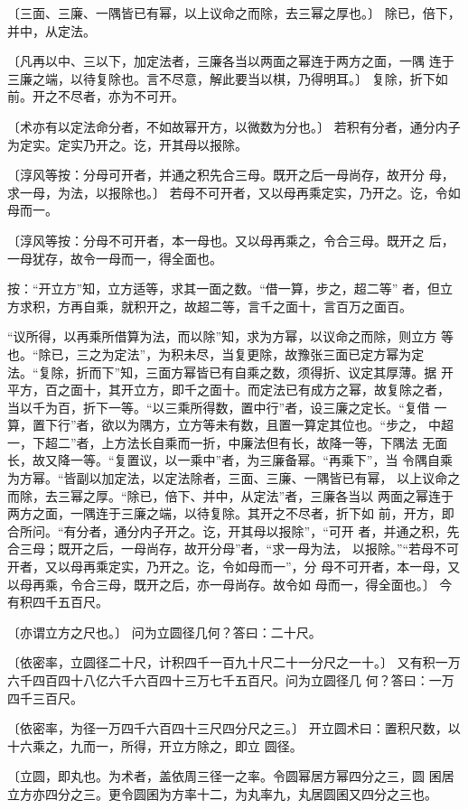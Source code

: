 \documentclass[12pt,UTF8]{ctexbook}
\begin{document}
〔三面、三廉、一隅皆已有幂，以上议命之而除，去三幂之厚也。〕 除已，倍下，并中，从定法。

〔凡再以中、三以下，加定法者，三廉各当以两面之幂连于两方之面，一隅 连于三廉之端，以待复除也。言不尽意，解此要当以棋，乃得明耳。〕 复除，折下如前。开之不尽者，亦为不可开。

〔术亦有以定法命分者，不如故幂开方，以微数为分也。〕 若积有分者，通分内子为定实。定实乃开之。讫，开其母以报除。

〔淳风等按：分母可开者，并通之积先合三母。既开之后一母尚存，故开分 母，求一母，为法，以报除也。〕 若母不可开者，又以母再乘定实，乃开之。讫，令如母而一。

〔淳风等按：分母不可开者，本一母也。又以母再乘之，令合三母。既开之 后，一母犹存，故令一母而一，得全面也。

按：“开立方”知，立方适等，求其一面之数。“借一算，步之，超二等” 者，但立方求积，方再自乘，就积开之，故超二等，言千之面十，言百万之面百。

“议所得，以再乘所借算为法，而以除”知，求为方幂，以议命之而除，则立方 等也。“除已，三之为定法”，为积未尽，当复更除，故豫张三面已定方幂为定 法。“复除，折而下”知，三面方幂皆已有自乘之数，须得折、议定其厚薄。据 开平方，百之面十，其开立方，即千之面十。而定法已有成方之幂，故复除之者， 当以千为百，折下一等。“以三乘所得数，置中行”者，设三廉之定长。“复借 一算，置下行”者，欲以为隅方，立方等未有数，且置一算定其位也。“步之， 中超一，下超二”者，上方法长自乘而一折，中廉法但有长，故降一等，下隅法 无面长，故又降一等。“复置议，以一乘中”者，为三廉备幂。“再乘下”，当 令隅自乘为方幂。“皆副以加定法，以定法除者，三面、三廉、一隅皆已有幂， 以上议命之而除，去三幂之厚。“除已，倍下、并中，从定法”者，三廉各当以 两面之幂连于两方之面，一隅连于三廉之端，以待复除。其开之不尽者，折下如 前，开方，即合所问。“有分者，通分内子开之。讫，开其母以报除”，“可开 者，并通之积，先合三母；既开之后，一母尚存，故开分母”者，“求一母为法， 以报除。”“若母不可开者，又以母再乘定实，乃开之。讫，令如母而一”，分 母不可开者，本一母，又以母再乘，令合三母，既开之后，亦一母尚存。故令如 母而一，得全面也。〕 今有积四千五百尺。

〔亦谓立方之尺也。〕 问为立圆径几何？答曰：二十尺。

〔依密率，立圆径二十尺，计积四千一百九十尺二十一分尺之一十。〕 又有积一万六千四百四十八亿六千六百四十三万七千五百尺。问为立圆径几 何？答曰：一万四千三百尺。

〔依密率，为径一万四千六百四十三尺四分尺之三。〕 开立圆术曰：置积尺数，以十六乘之，九而一，所得，开立方除之，即立 圆径。

〔立圆，即丸也。为术者，盖依周三径一之率。令圆幂居方幂四分之三，圆 囷居立方亦四分之三。更令圆囷为方率十二，为丸率九，丸居圆囷又四分之三也。
\end{document}
